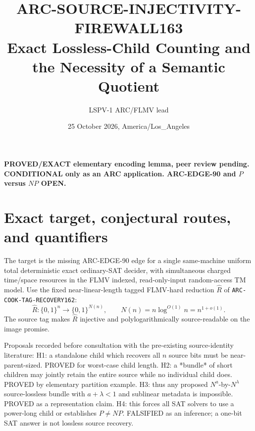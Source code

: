\documentclass[11pt]{article}
\title{ARC-SOURCE-INJECTIVITY-FIREWALL163\\
\large Exact Lossless-Child Counting and the Necessity of a Semantic Quotient}
\author{LSPV-1 ARC/FLMV lead}
\date{25 October 2026, America/Los\_Angeles}
\begin{document}
\maketitle
\begin{center}
\textbf{PROVED/EXACT elementary encoding lemma, peer review pending.}\\
\textbf{CONDITIONAL only as an ARC application. ARC-EDGE-90 and $P$ versus $NP$ OPEN.}
\end{center}

\section{Exact target, conjectural routes, and quantifiers}
The target is the missing ARC-EDGE-90 edge for a single same-machine
uniform total deterministic exact ordinary-SAT decider, with
simultaneous charged time/space resources in the FLMV indexed,
read-only-input random-access TM model.
Use the fixed near-linear-length tagged FLMV-hard reduction
$\widehat R$ of \texttt{ARC-COOK-TAG-RECOVERY162}:
\[
 \widehat R:\{0,1\}^n\to\{0,1\}^{N(n)},\qquad
 N(n)=n\log^{O(1)}n=n^{1+o(1)}.
\]
The source tag makes $\widehat R$ injective and polylogarithmically
source-readable on the image promise.

Proposals recorded before consultation with the pre-existing
source-identity literature:
H1: a standalone child which recovers all $n$ source bits must be
near-parent-sized. PROVED for worst-case child length.
H2: a *bundle* of short children may jointly retain the entire source
while no individual child does. PROVED by elementary partition example.
H3: thus any proposed $N^{a}$-by-$N^\lambda$ source-lossless
bundle with $a+\lambda<1$ and sublinear metadata is impossible.
PROVED as a representation claim.
H4: this forces all SAT solvers to use a power-long child or
establishes $P\ne NP$. FALSIFIED as an inference; a one-bit SAT
answer is not lossless source recovery.
\end{document}
